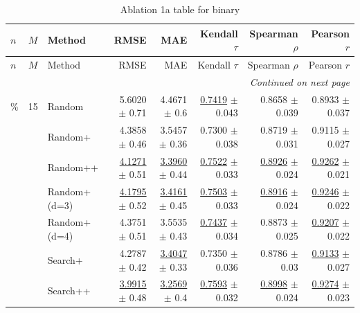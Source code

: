 \footnotesize
\setlength{\tabcolsep}{2pt}
\renewcommand{\arraystretch}{1.05}
\setlength{\LTpre}{0pt}
\setlength{\LTpost}{0pt}
\setlength{\LTleft}{\fill}
\setlength{\LTright}{\fill}
\begin{longtable}{llp{}rrrrr}
\caption{Ablation 1a table for binary}\label{tab:ablation\_1a\_binary}\\
\toprule
$n$ & $M$ & Method & RMSE & MAE & Kendall $\tau$ & Spearman $\rho$ & Pearson $r$ \\
\midrule
\endfirsthead
\toprule
$n$ & $M$ & Method & RMSE & MAE & Kendall $\tau$ & Spearman $\rho$ & Pearson $r$ \\
\midrule
\endhead
\midrule
\multicolumn{8}{r}{\emph{Continued on next page}} \\
\midrule
\endfoot
\bottomrule
\endlastfoot
5\% & 15 & Random & 5.6020 {\scriptsize $\pm$ 0.71} & 4.4671 {\scriptsize $\pm$ 0.6} & \underline{0.7419} {\scriptsize $\pm$ 0.043} & 0.8658 {\scriptsize $\pm$ 0.039} & 0.8933 {\scriptsize $\pm$ 0.037} \\
 &  & Random+ & 4.3858 {\scriptsize $\pm$ 0.46} & 3.5457 {\scriptsize $\pm$ 0.36} & 0.7300 {\scriptsize $\pm$ 0.038} & 0.8719 {\scriptsize $\pm$ 0.031} & 0.9115 {\scriptsize $\pm$ 0.027} \\
 &  & Random++ & \underline{4.1271} {\scriptsize $\pm$ 0.51} & \underline{3.3960} {\scriptsize $\pm$ 0.44} & \underline{0.7522} {\scriptsize $\pm$ 0.033} & \underline{0.8926} {\scriptsize $\pm$ 0.024} & \underline{0.9262} {\scriptsize $\pm$ 0.021} \\
 &  & Random+ (d=3) & \underline{4.1795} {\scriptsize $\pm$ 0.52} & \underline{3.4161} {\scriptsize $\pm$ 0.45} & \underline{0.7503} {\scriptsize $\pm$ 0.033} & \underline{0.8916} {\scriptsize $\pm$ 0.024} & \underline{0.9246} {\scriptsize $\pm$ 0.022} \\
 &  & Random+ (d=4) & 4.3751 {\scriptsize $\pm$ 0.51} & 3.5535 {\scriptsize $\pm$ 0.43} & \underline{0.7437} {\scriptsize $\pm$ 0.034} & 0.8873 {\scriptsize $\pm$ 0.025} & \underline{0.9207} {\scriptsize $\pm$ 0.022} \\
 &  & Search+ & 4.2787 {\scriptsize $\pm$ 0.42} & \underline{3.4047} {\scriptsize $\pm$ 0.33} & 0.7350 {\scriptsize $\pm$ 0.036} & 0.8786 {\scriptsize $\pm$ 0.03} & \underline{0.9133} {\scriptsize $\pm$ 0.027} \\
 &  & Search++ & \underline{3.9915} {\scriptsize $\pm$ 0.48} & \underline{3.2569} {\scriptsize $\pm$ 0.4} & \underline{0.7593} {\scriptsize $\pm$ 0.032} & \underline{0.8998} {\scriptsize $\pm$ 0.024} & \underline{0.9274} {\scriptsize $\pm$ 0.023} \\

\end{longtable}
